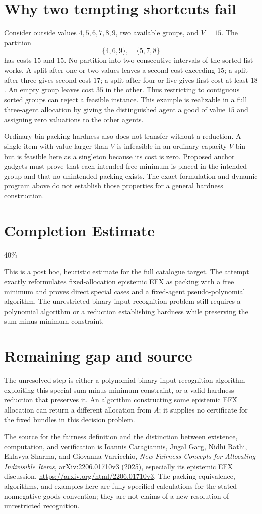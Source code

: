 \documentclass[11pt]{article}
\begin{document}
\section*{Why two tempting shortcuts fail}
Consider outside values $4,5,6,7,8,9$, two available groups, and $V=15$.
The partition
\[
       \{4,6,9\},\quad\{5,7,8\}
\]
has costs $15$ and $15$. No partition into two consecutive intervals of
the sorted list works. A split after one or two values leaves a second
cost exceeding $15$; a split after three gives second cost $17$; a split
after four or five gives first cost at least $18$. An empty group leaves
cost $35$ in the other. Thus restricting to contiguous sorted groups can
reject a feasible instance. This example is realizable in a full
three-agent allocation by giving the distinguished agent a good of value
$15$ and assigning zero valuations to the other agents.

Ordinary bin-packing hardness also does not transfer without a reduction.
A single item with value larger than $V$ is infeasible in an ordinary
capacity-$V$ bin but is feasible here as a singleton because its cost is
zero. Proposed anchor gadgets must prove that each intended free minimum
is placed in the intended group and that no unintended packing exists.
The exact formulation and dynamic program above do not establish those
properties for a general hardness construction.

\section{Completion Estimate}
40\%

This is a post hoc, heuristic estimate for the full catalogue target.
The attempt exactly reformulates fixed-allocation epistemic EFX as packing with a free minimum and proves direct special cases and a fixed-agent pseudo-polynomial algorithm. The unrestricted binary-input recognition problem still requires a polynomial algorithm or a reduction establishing hardness while preserving the sum-minus-minimum constraint.

\section*{Remaining gap and source}
The unresolved step is either a polynomial binary-input recognition
algorithm exploiting this special sum-minus-minimum constraint, or a
valid hardness reduction that preserves it. An algorithm constructing
some epistemic EFX allocation can return a different allocation from $A$;
it supplies no certificate for the fixed bundles in this decision problem.

The source for the fairness definition and the distinction between
existence, computation, and verification is Ioannis Caragiannis, Jugal
Garg, Nidhi Rathi, Eklavya Sharma, and Giovanna Varricchio,
\emph{New Fairness Concepts for Allocating Indivisible Items},
arXiv:2206.01710v3 (2025), especially its epistemic EFX discussion.
\url{https://arxiv.org/html/2206.01710v3}.
The packing equivalence, algorithms, and examples here are fully specified
calculations for the stated nonnegative-goods convention; they are not
claims of a new resolution of unrestricted recognition.
\end{document}

